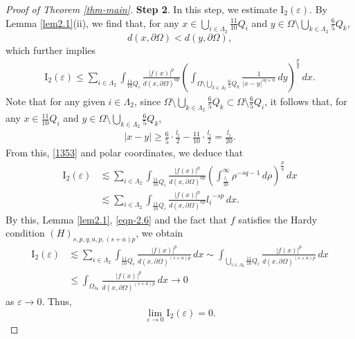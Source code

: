 \documentclass[11pt,twoside]{article}
\def\Qi{\frac{11}{10}Q_i}
\def\Qkk{\frac{6}{5}Q_k}
\def\Qii{\frac{6}{5}Q_i}
\def\blz{\Lambda}
\def\boz{{\Omega}}
\def\vez{\varepsilon}
\def\pa{\partial}                %
\def\huae{\varepsilon}
\def\bozthreee{\boz_{3\huae}}
\theoremstyle{mylem}
\theoremstyle{definition}
\numberwithin{equation}{section}
\begin{document}
\begin{proof}[Proof of Theorem \ref{thm-main}]
{\bf Step 2}. In this step, we estimate $\mathrm{I}_2(\vez)$.
By Lemma \ref{lem2.1}(ii), we find that,
for any $x\in\bigcup_{i \in \blz_2} \Qi$ and $y\in\boz \setminus\bigcup_{k \in \blz_2} \Qkk$, 
$$d(x,\pa\boz)<d(y,\pa\boz),$$ which further implies
\begin{align}\label{1353}
\mathrm{I}_2(\vez)\leq \sum_{i \in \Lambda_2} \int_{\Qi} \frac{| f(x) |^p}{d(x,\pa\boz)^{ap}} \left( \int_{\boz \setminus \bigcup_{k \in \blz_2} \Qkk} \frac{1}{|x - y|^{s q + n}}\,dy \right)^{\frac{p}{q}} \,dx. 
\end{align}
Note that for any given $i\in\blz_2$, since $\boz \setminus\bigcup_{k \in \blz_2}\Qkk\subset\boz \setminus \Qii$, it follows that, for any \(x \in \Qi\) and \( y \in \boz \setminus \bigcup_{k \in \blz_2}\Qkk\),
\begin{align}\label{eqn-7.5}
|x-y|\geq \frac{6}{5}\cdot\frac{l_i}{2}-\frac{11}{10}\cdot\frac{l_i}{2} =\frac{l_i}{20}.
\end{align}
From this, \eqref{1353} and polar coordinates, we deduce that
\begin{align*}
\mathrm{I}_2(\vez)
&\lesssim \sum_{i \in \Lambda_2} \int_{\Qi} \frac{| f(x) |^p}{d(x,\pa\boz)^{ap}} \left( \int_{\frac{l_i}{20}}^\infty \rho^{-s q - 1}\,d\rho \right)^{\frac{p}{q}}\,dx\\
&\lesssim \sum_{i \in \Lambda_2} \int_{\Qi} \frac{| f(x) |^p}{d(x,\pa\boz)^{ap}}   {l_i}^{-s p}\,dx .
\end{align*}
By this, Lemma \ref{lem2.1}, \eqref{eqn-2.6} and the fact that $f$ satisfies the Hardy condition $(H)_{s,p,q,a,p,(s+a)p}$, we obtain
\begin{align*}
\mathrm{I}_2(\vez)
&\lesssim \sum_{i \in \Lambda_2} \int_{\Qi} \frac{| f(x)|^p}{d(x, \partial\Omega)^{(s+a) p}}\,dx 
\sim \int_{\bigcup_{i \in \Lambda_2} \Qi} \frac{| f(x)|^p}{d(x, \partial\Omega)^{(s+a) p}}\,dx \nonumber \\
&\leq \int_{\bozthreee}\frac{ |f(x)|^p}{d(x, \partial\Omega)^{(s+a)p}}\,dx \to 0 
\end{align*}
as $\varepsilon \to 0$. Thus,
\begin{equation}\label{eqn-4.6}
\lim_{\varepsilon \to 0} \mathrm{I}_2(\vez) = 0. 
\end{equation}


\end{proof}
\end{document}
